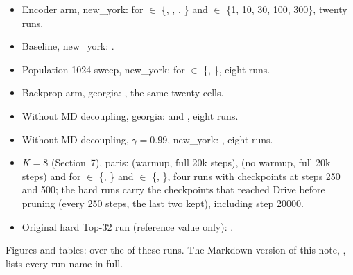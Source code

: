 \documentclass[11pt,a4paper]{article}
\begin{document}
\begin{itemize}[leftmargin=1.4em]
\item Encoder arm, new\_york: 
  for  $\in$ \{, , , \} and
   $\in$ \{1, 10, 30, 100, 300\}, twenty runs.
\item Baseline, new\_york: .
\item Population-1024 sweep, new\_york: 
  for  $\in$ \{, \}, eight runs.
\item Backprop arm, georgia: ,
  the same twenty cells.
\item Without MD decoupling, georgia: 
  and , eight runs.
\item Without MD decoupling, $\gamma = 0.99$, new\_york:
  , eight runs.
\item $K = 8$ (Section~7), paris: 
  (warmup, full 20k steps), 
  (no warmup, full 20k steps) and
   for
   $\in$ \{, \} and  $\in$ \{,
  \}, four runs with checkpoints at steps 250 and 500; the hard runs
  carry the checkpoints that reached Drive before pruning (every 250 steps,
  the last two kept), including step 20000.
\item Original hard Top-32 run (reference value only):
  .
\end{itemize}

Figures and tables:  over the
 of these runs. The Markdown version of this note,
, lists every run name in full.
\end{document}
